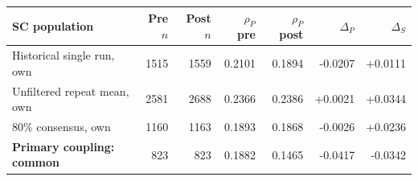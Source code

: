 \begin{tabular}{lrrrrrr}
\toprule
SC population & Pre $n$ & Post $n$ & $\rho_P$ pre & $\rho_P$ post & $\Delta_P$ & $\Delta_S$ \\
\midrule
Historical single run, own & 1515 & 1559 & 0.2101 & 0.1894 & -0.0207 & +0.0111 \\
Unfiltered repeat mean, own & 2581 & 2688 & 0.2366 & 0.2386 & +0.0021 & +0.0344 \\
80\% consensus, own & 1160 & 1163 & 0.1893 & 0.1868 & -0.0026 & +0.0236 \\
\textbf{Primary coupling: common} & 823 & 823 & 0.1882 & 0.1465 & -0.0417 & -0.0342 \\
\bottomrule
\end{tabular}
